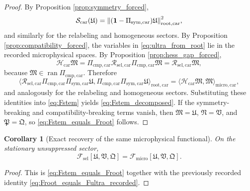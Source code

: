 \documentclass[11pt]{article}
\newcommand{\UltraFunctional}{\mathscr F_{\mathrm{micro}}}
\newcommand{\StemFunctional}{\mathscr F_{\mathrm{sel}}}
\newcommand{\UltraTensor}{\mathfrak M}
\newcommand{\UltraRelabel}{\mathfrak N}
\newcommand{\UltraFree}{\mathfrak P}
\newcommand{\RootTensor}{\mathfrak U}
\newcommand{\RootRelabel}{\mathfrak V}
\newcommand{\RootFree}{\mathfrak Q}
\newcommand{\TensorSymProj}{\Pi_{\mathrm{sym,car}}}
\newcommand{\TensorHess}{\mathcal H_{\mathrm{car}}}
\newcommand{\TensorCmpProj}{\Pi_{\mathrm{cmp,car}}}
\newcommand{\TensorResp}{\mathcal R_{\mathrm{sel,car}}}
\newtheorem{corollary}{Corollary}
\begin{document}
\begin{proof}
By Proposition \ref{prop:symmetry_forced},
\[
\mathcal S_{\mathrm{car}}(\RootTensor)
=
\norm{(\mathbf 1-\TensorSymProj)\RootTensor}_{\mathrm{root,car}}^2,
\]
and similarly for the relabeling and homogeneous sectors. By Proposition \ref{prop:compatibility_forced}, the variables in \eqref{eq:ultra_from_root} lie in the recorded microphysical spaces. By Proposition \ref{prop:hess_gap_forced},
\[
\TensorHess\UltraTensor
=
\TensorCmpProj\TensorResp\TensorCmpProj\UltraTensor
=
\TensorResp\UltraTensor,
\]
because \(\UltraTensor\in\operatorname{ran}\TensorCmpProj\). Therefore
\[
\langle \TensorResp\TensorCmpProj\TensorSymProj\RootTensor,
\TensorCmpProj\TensorSymProj\RootTensor\rangle_{\mathrm{root,car}}
=
\langle \TensorHess\UltraTensor,\UltraTensor\rangle_{\mathrm{micro,car}},
\]
and analogously for the relabeling and homogeneous sectors. Substituting these identities into \eqref{eq:Fstem} yields \eqref{eq:Fstem_decomposed}. If the symmetry-breaking and compatibility-breaking terms vanish, then \(\UltraTensor=\RootTensor\), \(\UltraRelabel=\RootRelabel\), and \(\UltraFree=\RootFree\), so \eqref{eq:Fstem_equals_Froot} follows.
\end{proof}

\begin{corollary}[Exact recovery of the same microphysical functional]
\label{cor:recover_ultra}
On the stationary unsuppressed sector,
\begin{equation}
\StemFunctional[\RootTensor,\RootRelabel,\RootFree]
=
\UltraFunctional[\RootTensor,\RootRelabel,\RootFree].
\label{eq:Fstem_equals_Fultra}
\end{equation}
\end{corollary}

\begin{proof}
This is \eqref{eq:Fstem_equals_Froot} together with the previously recorded identity \eqref{eq:Froot_equals_Fultra_recorded}.
\end{proof}
\end{document}
